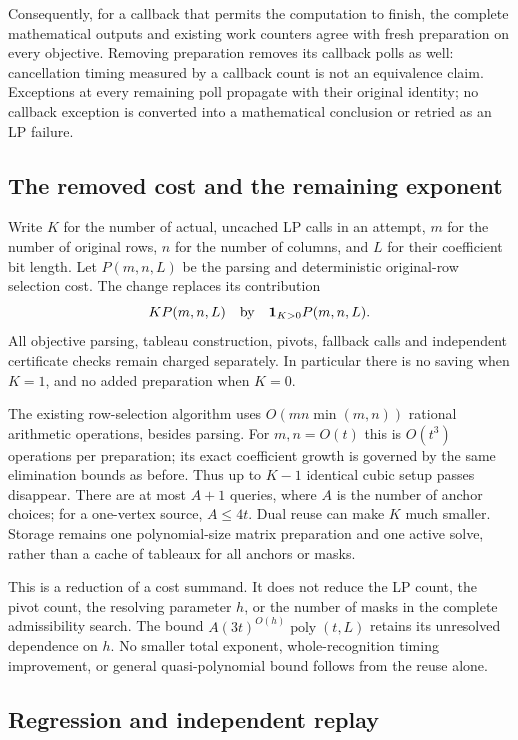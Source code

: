 Consequently, for a callback that permits the computation to finish,
the complete mathematical outputs and existing work counters agree with
fresh preparation on every objective.  Removing preparation removes its
callback polls as well: cancellation timing measured by a callback count
is not an equivalence claim.  Exceptions at every remaining poll propagate
with their original identity; no callback exception is converted into a
mathematical conclusion or retried as an LP failure.

\subsection{The removed cost and the remaining exponent}

Write $K$ for the number of actual, uncached LP calls in an attempt, $m$
for the number of original rows, $n$ for the number of columns, and $L$
for their coefficient bit length.  Let $P(m,n,L)$ be the parsing and
deterministic original-row selection cost.  The change replaces its
contribution
\[
                 K P(m,n,L)
          \quad\hbox{by}\quad
                 \mathbf1_{K>0}P(m,n,L).
\]
All objective parsing, tableau construction, pivots, fallback calls and
independent certificate checks remain charged separately.  In particular
there is no saving when $K=1$, and no added preparation when $K=0$.

The existing row-selection algorithm uses
$O(mn\min(m,n))$ rational arithmetic operations, besides parsing.  For
$m,n=O(t)$ this is $O(t^3)$ operations per preparation; its exact coefficient
growth is governed by the same elimination bounds as before.  Thus up to
$K-1$ identical cubic setup passes disappear.  There are at most $A+1$
queries, where $A$ is the number of anchor choices; for a one-vertex source,
$A\le4t$.  Dual reuse can make $K$ much smaller.  Storage remains one
polynomial-size matrix preparation and one active solve, rather than a
cache of tableaux for all anchors or masks.

This is a reduction of a cost summand.  It does not reduce the LP count,
the pivot count, the resolving parameter $h$, or the number of masks in
the complete admissibility search.  The bound
$A(3t)^{O(h)}\operatorname{poly}(t,L)$ retains its unresolved dependence
on $h$.  No smaller total exponent, whole-recognition timing improvement,
or general quasi-polynomial bound follows from the reuse alone.

\subsection{Regression and independent replay}

